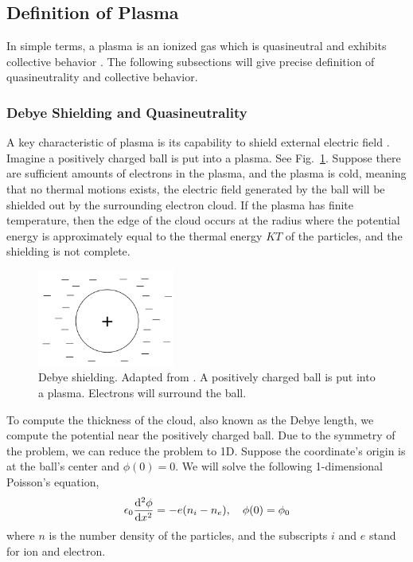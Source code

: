 \subsection{Definition of Plasma}
In simple terms, a plasma is an ionized gas which is quasineutral and exhibits collective behavior \cite{chen_introduction_2016}. The following subsections will give precise definition of quasineutrality and collective behavior.

\subsubsection*{Debye Shielding and Quasineutrality}
A key characteristic of plasma is its capability to shield external electric field \cite{chen_introduction_2016}. Imagine a positively charged ball is put into a plasma. See Fig.~\ref{fig:debye-shielding}. Suppose there are sufficient amounts of electrons in the plasma, and the plasma is cold, meaning that no thermal motions exists, the electric field generated by the ball will be shielded out by the surrounding electron cloud. If the plasma has finite temperature, then the edge of the cloud occurs at the radius where the potential energy is approximately equal to the thermal energy $KT$ of the particles, and the shielding is not complete.

\begin{figure}[htbp]
	\centering
	\includegraphics[width=0.4\textwidth]{figures/debye-shielding.png}
	\caption{Debye shielding. Adapted from \cite{chen_introduction_2016}. A positively charged ball is put into a plasma. Electrons will surround the ball.}
	\label{fig:debye-shielding}
\end{figure}

To compute the thickness of the cloud, also known as the Debye length, we compute the potential near the positively charged ball. Due to the symmetry of the problem, we can reduce the problem to 1D. Suppose the coordinate's origin is at the ball's center and $\phi(0)=0$. We will solve the following 1-dimensional Poisson's equation,
\begin{equation}
	\epsilon_0\dv[2]{\phi}{x} = -e(n_i - n_e), \quad \phi(0) = \phi_0
\end{equation}
where $n$ is the number density of the particles, and the subscripts $i$ and $e$ stand for ion and electron.

